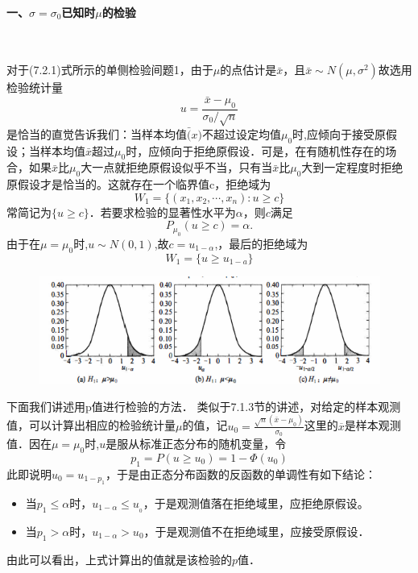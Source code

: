 \paragraph{一、$\sigma=\sigma_0$已知时$\mu$的检验}~{}

对于(7.2.1)式所示的单侧检验间题1，由于$\mu$的点估计是$\bar{x}$，且$\bar{x} \sim  N(\mu,\sigma^2)$故选用检验统计量
\begin{equation}
    u=\frac{\bar{x}-\mu_0}{\sigma_0/\sqrt{n}}
\end{equation}
是恰当的直觉告诉我们：当样本均值$\bar(x)$不超过设定均值$\mu_0$时,应倾向于接受原假设；当样本均值$\bar{x}$超过$\mu_0$时，应倾向于拒绝原假设．可是，在有随机性存在的场合，如果$\bar{x}$比$\mu_0$大一点就拒绝原假设似乎不当，只有当$\bar{x}$比$\mu_0$大到一定程度时拒绝原假设才是恰当的。这就存在一个临界值c，拒绝域为
\begin{equation}
    W_{1}=\{(x_{1},x_{2},\cdots,x_{n}):u\geq c\}
\end{equation}
常简记为$\{u\geq c\}$．若要求检验的显著性水平为$\alpha$，则$c$满足
$$P_{\mu_{0}}(u\geqslant c)=\alpha.$$
由于在$\mu=\mu_0$时,$u\sim N(0,1)$,故$c=u_{1-\alpha}$,，最后的拒绝域为
\begin{equation}
    W_1=\{u\geq u_{1-a}\}
\end{equation}
\begin{figure}[H]
    \centering
    \includegraphics{figures/fig721.png}
\end{figure}
下面我们讲述用p值进行检验的方法．
类似于7.1.3节的讲述，对给定的样本观测值，可以计算出相应的检验统计量$\mu$的值，记$u_{0}=\frac{\sqrt{n}\left(\overline{x}-\mu_{0}\right)}{\sigma_{0}}$这里的$\overline{x}$是样本观测值．因在$\mu=\mu_{0}$时,$u$是服从标准正态分布的随机变量，令
\begin{equation}p_{1}=P(u\geq u_{0})=1-\Phi(u_{0})\end{equation}
此即说明$u_{0}=u_{1-p_{1}}$，于是由正态分布函数的反函数的单调性有如下结论：
\begin{itemize}
    \item 当$p_{1}\leqslant\alpha$时，$u_{1-\alpha}\leq u_{_0}$，于是观测值落在拒绝域里，应拒绝原假设。
    \item 当$p_{1}>\alpha$时，$u_{1-\alpha}>u_{0}$，于是观测值不在拒绝域里，应接受原假设．
\end{itemize}
由此可以看出，上式计算出的值就是该检验的$p$值．

